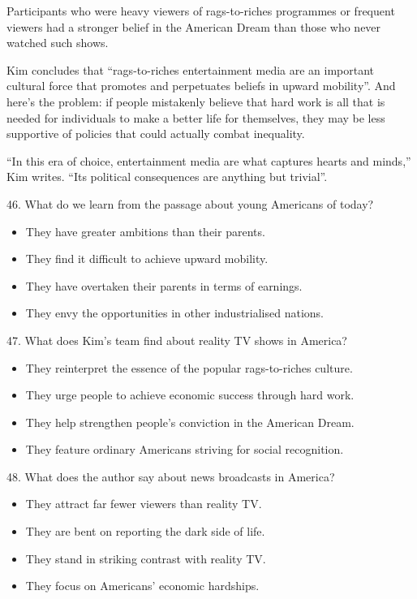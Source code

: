 \documentclass[UTF8,11pt]{ctexart}
\begin{document}
Participants who were heavy viewers of rags-to-riches programmes or frequent viewers had a stronger belief in the American Dream than those who never watched such shows.


Kim concludes that “rags-to-riches entertainment media are an important cultural force that promotes and perpetuates beliefs in upward mobility”. And here’s the problem: if people mistakenly believe that hard work is all that is needed for individuals to make a better life for themselves, they may be less supportive of policies that could actually combat inequality.


“In this era of choice, entertainment media are what captures hearts and minds,” Kim writes. “Its political consequences are anything but trivial”.


46. What do we learn from the passage about young Americans of today?


\begin{itemize}[leftmargin=2em,itemsep=.2em,topsep=.4em]\item[A.] They have greater ambitions than their parents.
\item[B.] They find it difficult to achieve upward mobility.
\item[C.] They have overtaken their parents in terms of earnings.
\item[D.] They envy the opportunities in other industrialised nations.
\end{itemize}

47. What does Kim’s team find about reality TV shows in America?


\begin{itemize}[leftmargin=2em,itemsep=.2em,topsep=.4em]\item[A.] They reinterpret the essence of the popular rags-to-riches culture.
\item[B.] They urge people to achieve economic success through hard work.
\item[C.] They help strengthen people’s conviction in the American Dream.
\item[D.] They feature ordinary Americans striving for social recognition.
\end{itemize}

48. What does the author say about news broadcasts in America?


\begin{itemize}[leftmargin=2em,itemsep=.2em,topsep=.4em]\item[A.] They attract far fewer viewers than reality TV.
\item[B.] They are bent on reporting the dark side of life.
\item[C.] They stand in striking contrast with reality TV.
\item[D.] They focus on Americans’ economic hardships.
\end{itemize}
\end{document}
